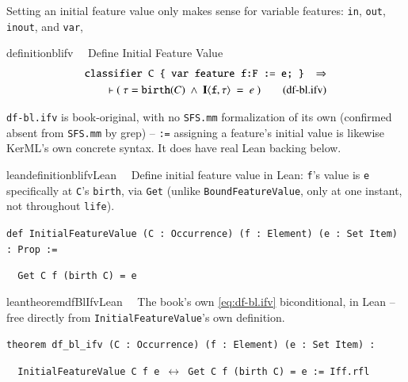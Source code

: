 Setting an initial feature value only makes sense for variable features:  \texttt{in}, \texttt{out}, \texttt{inout}, and \texttt{var},

\begin{restatable}{definition}{blifv}~~ Define Initial Feature Value
\begin{align}
\texttt{classifier C \{ var feature f:F := e; \} }~\Rightarrow \notag \\
\vdash (~\tau = \texttt{birth}(C)~\wedge~  \textbf{I}\langle \texttt{f},\tau\rangle~=~e ~)
\label{eq:df-bl.ifv}\tag{df-bl.ifv}
\end{align}
\end{restatable}

\pn \texttt{df-bl.ifv} is book-original, with no \texttt{SFS.mm} formalization of its own (confirmed
absent from \texttt{SFS.mm} by grep) -- \texttt{:=} assigning a feature's initial value is likewise
KerML's own concrete syntax. It does have real Lean backing below.

\begin{restatable}{leandefinition}{blifvLean}~~ Define initial feature
value in Lean: \texttt{f}'s value is \texttt{e} specifically at \texttt{C}'s \texttt{birth}, via
\texttt{Get} (unlike \texttt{BoundFeatureValue}, only at one instant, not throughout \texttt{life}).

\texttt{\textcolor{leancolor}{def} \textcolor{leanyellow}{InitialFeatureValue} (C : Occurrence) (f : Element) (e : Set Item) : Prop :=}

\texttt{~~Get C f (birth C) = e}
\label{InitialFeatureValue}
\end{restatable}

\begin{restatable}{leantheorem}{dfBlIfvLean}~~ The book's own \ref{eq:df-bl.ifv}
biconditional, in Lean -- free directly from \texttt{InitialFeatureValue}'s own definition.

\texttt{\textcolor{leancolor}{theorem} \textcolor{leanyellow}{df\_bl\_ifv} (C : Occurrence) (f : Element) (e : Set Item) :}

\texttt{~~InitialFeatureValue C f e $\leftrightarrow$ Get C f (birth C) = e := Iff.rfl}
\label{df_bl_ifv}
\end{restatable}


